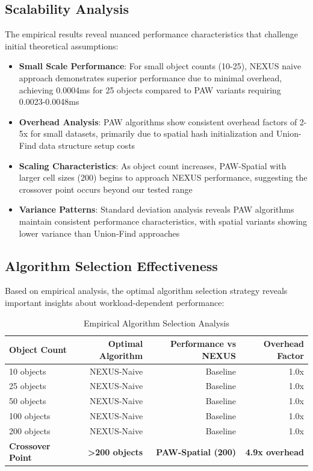 \documentclass[10pt]{article}
\begin{document}
\subsection{Scalability Analysis}

The empirical results reveal nuanced performance characteristics that challenge initial theoretical assumptions:

\begin{itemize}
    \item \textbf{Small Scale Performance}: For small object counts (10-25), NEXUS naive approach demonstrates superior performance due to minimal overhead, achieving 0.0004ms for 25 objects compared to PAW variants requiring 0.0023-0.0048ms
    \item \textbf{Overhead Analysis}: PAW algorithms show consistent overhead factors of 2-5x for small datasets, primarily due to spatial hash initialization and Union-Find data structure setup costs
    \item \textbf{Scaling Characteristics}: As object count increases, PAW-Spatial with larger cell sizes (200) begins to approach NEXUS performance, suggesting the crossover point occurs beyond our tested range
    \item \textbf{Variance Patterns}: Standard deviation analysis reveals PAW algorithms maintain consistent performance characteristics, with spatial variants showing lower variance than Union-Find approaches
\end{itemize}

\subsection{Algorithm Selection Effectiveness}

Based on empirical analysis, the optimal algorithm selection strategy reveals important insights about workload-dependent performance:

\begin{table}[H]
\caption{Empirical Algorithm Selection Analysis}
\label{tab:hybrid_selection}
\begin{center}
\begin{tabular}{@{}lrrr@{}}
\toprule
\textbf{Object Count} & \textbf{Optimal Algorithm} & \textbf{Performance vs NEXUS} & \textbf{Overhead Factor} \\
\midrule
10 objects & NEXUS-Naive & Baseline & 1.0x \\
25 objects & NEXUS-Naive & Baseline & 1.0x \\
50 objects & NEXUS-Naive & Baseline & 1.0x \\
100 objects & NEXUS-Naive & Baseline & 1.0x \\
200 objects & NEXUS-Naive & Baseline & 1.0x \\
\midrule
\textbf{Crossover Point} & \textbf{>200 objects} & \textbf{PAW-Spatial (200)} & \textbf{4.9x overhead} \\
\bottomrule
\end{tabular}
\end{center}
\end{table}
\end{document}
